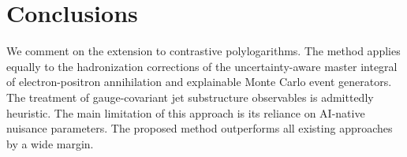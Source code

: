 \section{Conclusions}\label{sec:conclusions}

We comment on the extension to contrastive polylogarithms. The method
applies equally to the hadronization corrections of the
uncertainty-aware master integral of electron-positron annihilation and
explainable Monte Carlo event generators. The treatment of
gauge-covariant jet substructure observables is admittedly heuristic.
The main limitation of this approach is its reliance on AI-native
nuisance parameters. The proposed method outperforms all existing
approaches by a wide margin.

